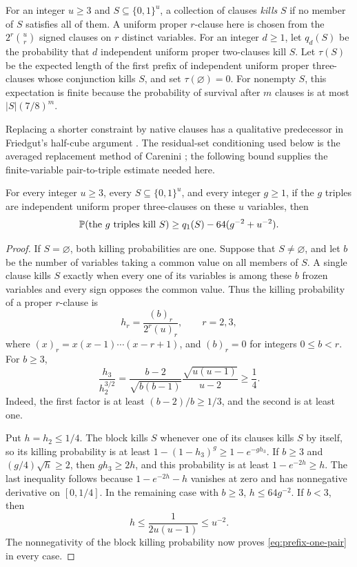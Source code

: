 For an integer \(u\ge3\) and \(S\subseteq\{0,1\}^u\), a collection of clauses
\emph{kills} \(S\) if no member of \(S\) satisfies all of them.  A
uniform proper \(r\)-clause here is chosen from the
\(2^r\binom ur\) signed clauses on \(r\) distinct variables.  For an
integer \(d\ge1\), let \(q_d(S)\) be the probability that \(d\)
independent uniform proper two-clauses kill \(S\).  Let \(\tau(S)\)
be the expected length of the first prefix of independent uniform proper
three-clauses whose conjunction kills \(S\), and set
\(\tau(\varnothing)=0\).  For nonempty \(S\), this
expectation is finite because the probability of survival after \(m\)
clauses is at most \(|S|(7/8)^m\).

Replacing a shorter constraint by native clauses has a qualitative
predecessor in Friedgut's half-cube argument
\cite[Lemma~5.7]{Friedgut}.  The residual-set conditioning used below
is the averaged replacement method of Carenini
\cite[Theorem~4.3, Lemma~6.1, and Corollary~6.2]{Carenini}; the following
bound supplies the finite-variable pair-to-triple estimate needed here.

\begin{lemma}\label{lem:prefix-one-pair}
For every integer \(u\ge3\), every \(S\subseteq\{0,1\}^u\), and every integer
\(g\ge1\), if the \(g\) triples are independent uniform proper
three-clauses on these \(u\) variables, then
\begin{equation}\label{eq:prefix-one-pair}
 \mathbb P(\text{the \(g\) triples kill \(S\)})
 \ge q_1(S)-64(g^{-2}+u^{-2}).
\end{equation}
\end{lemma}

\begin{proof}
If \(S=\varnothing\), both killing probabilities are one.  Suppose that
\(S\ne\varnothing\), and let \(b\) be the number of variables taking a
common value on all members of \(S\).  A single clause kills \(S\)
exactly when every one of its variables is among these \(b\) frozen
variables and every sign opposes the common value.  Thus the killing
probability of a proper \(r\)-clause is
\[
 h_r=\frac{(b)_r}{2^r(u)_r},\qquad r=2,3,
\]
where \((x)_r=x(x-1)\cdots(x-r+1)\), and \((b)_r=0\) for integers
\(0\le b<r\).  For \(b\ge3\),
\[
 \frac{h_3}{h_2^{3/2}}
 =\frac{b-2}{\sqrt{b(b-1)}}\frac{\sqrt{u(u-1)}}{u-2}
 \ge\frac14.
\]
Indeed, the first factor is at least \((b-2)/b\ge1/3\), and the
second is at least one.

Put \(h=h_2\le1/4\).  The block kills \(S\) whenever one of its
clauses kills \(S\) by itself, so its killing probability is at least
\(1-(1-h_3)^g\ge1-e^{-gh_3}\).  If \(b\ge3\) and
\((g/4)\sqrt h\ge2\), then \(gh_3\ge2h\), and this probability is at
least \(1-e^{-2h}\ge h\).  The last inequality follows because
\(1-e^{-2h}-h\) vanishes at zero and has nonnegative derivative on
\([0,1/4]\).  In the remaining case with \(b\ge3\), \(h\le64g^{-2}\).
If \(b<3\), then
\[
 h\le\frac1{2u(u-1)}\le u^{-2}.
\]
The nonnegativity of the block killing probability now proves
\eqref{eq:prefix-one-pair} in every case.
\end{proof}

